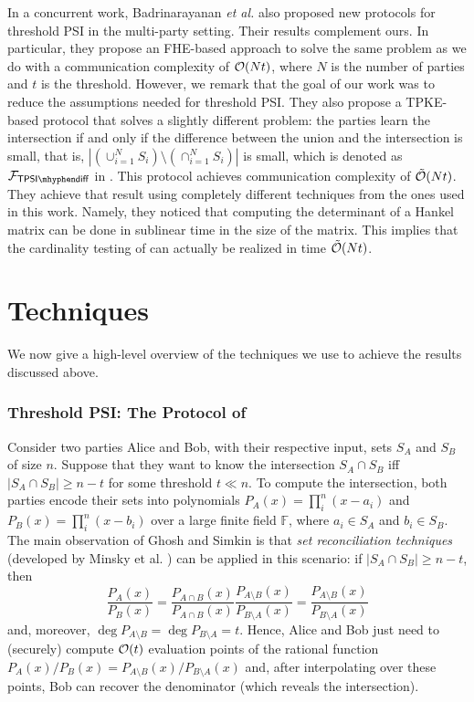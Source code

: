 In a concurrent work, Badrinarayanan \emph{et al.} \cite{PKC:BMRR21} also proposed new protocols for threshold PSI in the multi-party setting. Their results complement ours. In particular, they propose an FHE-based approach to solve the same problem as we do with a communication complexity of $\mathcal{O}(Nt)$, where $N$ is the number of parties and $t$ is the threshold. However, we remark that the goal of our work was to reduce the assumptions needed for threshold PSI. They also propose a TPKE-based protocol that solves a slightly different problem: the parties learn the intersection if and only if the difference between the union and the intersection is small, that is, $|\left(\cup_{i=1}^N S_i\right)\setminus \left(\cap_{i=1}^N S_i\right)|$ is small\footnotemark, which is denoted as $\Fc_{\mathsf{TPSI\mhyphen diff}}$ in \cite{PKC:BMRR21}. This protocol achieves communication complexity of $\tilde {\mathcal{O}}(Nt)$. They achieve that result using completely different techniques from the ones used in this work. Namely, they noticed that computing the determinant of a Hankel matrix can be done in sublinear time in the size of the matrix. This implies that the cardinality testing of \cite{C:GhoSim19} can actually be realized in time  $\tilde {\mathcal{O}}(Nt)$.



\section{Techniques}
We now give a high-level overview of the techniques we use to achieve the results discussed above.

\subsubsection{Threshold PSI: The Protocol of \cite{C:GhoSim19}}
Consider two parties Alice and Bob, with their respective input, sets $S_A$ and $S_B$ of size $n$. Suppose that they want to know the intersection $S_A\cap S_B$ iff $|S_A\cap S_B|\geq n-t$ for some threshold $t \ll n$. To compute the intersection, both parties  encode their sets into polynomials $P_A(x)=\prod_i^n (x-a_i)$ and $P_B(x)=\prod_i^n (x-b_i)$ over a large finite field $\mathbb{F}$, where $a_i\in S_A$ and $b_i\in S_B$. The main observation of Ghosh and Simkin \cite{C:GhoSim19} is that  \emph{set reconciliation techniques} (developed by Minsky et al. \cite{minsky03}) can be applied in this scenario: if $|S_A\cap S_B|\geq n-t$, then $$\frac{P_A(x)}{P_B(x)}=\frac{P_{A\cap B}(x)}{P_{A\cap B}(x)}\frac{P_{A\setminus B}(x)}{P_{B\setminus A}(x)}=\frac{P_{A\setminus B}(x)}{P_{B\setminus A}(x)}$$ and, moreover, $\deg P_{A\setminus B}=\deg P_{B\setminus A}=t$. Hence, Alice and Bob just need to (securely) compute $\mathcal{O}(t)$ evaluation points of the rational function $P_A(x)/P_B(x)=P_{A\setminus B}(x)/P_{B\setminus A}(x)$ and, after interpolating over these points, Bob can recover the denominator (which reveals the intersection). 

